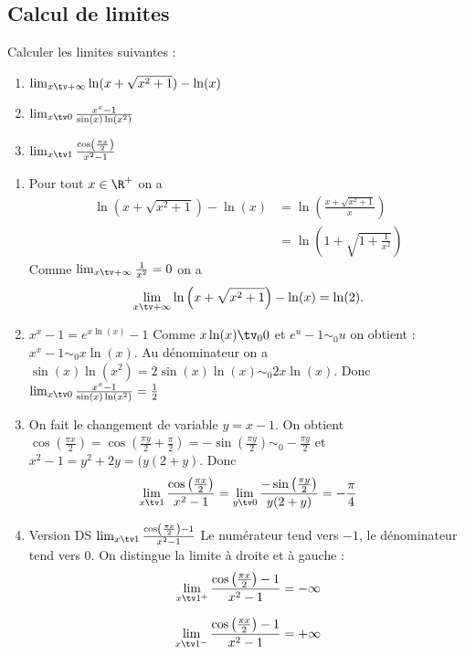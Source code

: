 \subsection{Calcul de limites}

\begin{exercice}
Calculer les limites suivantes : 

\begin{enumerate}
\item $\lim_{x\tv+\infty} \ln(x+\sqrt{x^2 +1}) -\ln(x)$\\

\item $\lim_{x\tv 0} \frac{x^x-1}{\sin(x)\ln(x^2)}$
\item $\lim_{x\tv 1} \frac{\cos\left(\frac{\pi x}{2}\right)}{x^2-1}$
\end{enumerate}
\end{exercice}



\begin{correction}
\begin{enumerate}

\item  Pour tout $x\in \R^+$ on a 
\begin{align*}
 \ln\left(x+\sqrt{x^2+1}\right) -\ln(x)  
							&= \ln\left(\frac{x+\sqrt{x^2+1}}{x}\right)  \\
							&= \ln\left(1+\sqrt{1+\frac{1}{x^2}}\right)  
\end{align*}
Comme $\lim_{x\tv+\infty} \frac{1}{x^2}=0$ on a 
$$\lim_{x\tv+\infty} \ln\left(x+\sqrt{x^2+1}\right) -\ln(x)  =\ln(2).$$

\item $x^x-1 = e^{x\ln(x) }-1 $ Comme $x\ln(x)\tv_0 0 $ et $e^u-1 \sim_0 u$  on obtient : $x^x-1 \sim_0 x\ln(x)$.
Au dénominateur on a  $\sin(x )\ln(x^2) =2\sin(x)\ln(x) \sim_0 2x \ln(x)$. 
Donc $\lim_{x\tv 0} \frac{x^x-1}{\sin(x)\ln(x^2)} = \frac{1}{2}$

\item On fait le changement de variable $y=x-1$. On obtient 
$\cos\left(\frac{\pi x}{2}\right) = \cos\left( \frac{\pi y}{2} +\frac{\pi}{2} \right) = -\sin\left(\frac{\pi y}{2}\right)\sim_0 -\frac{\pi y}{2}$
et $x^2 - 1 = y^2 +2y=(y(2+y) $. Donc 
$$\lim_{x\tv 1} \frac{\cos\left(\frac{\pi x}{2}\right) }{x^2-1}= \lim_{y\tv 0} \frac{ -\sin\left(\frac{\pi y}{2}\right)}{y(2+y)} = -\frac{\pi }{4}$$


\item Version DS $\lim_{x\tv 1} \frac{\cos\left(\frac{\pi x}{2}\right) - 1}{x^2-1}$
Le numérateur tend vers $-1$, le dénominateur tend vers $0$. On distingue la limite à droite et à gauche : 
$$\lim_{x\tv 1^+} \frac{\cos\left(\frac{\pi x}{2}\right) - 1}{x^2-1}= -\infty$$

$$\lim_{x\tv 1^-} \frac{\cos\left(\frac{\pi x}{2}\right) - 1}{x^2-1}= +\infty$$


\end{enumerate}
\end{correction}






